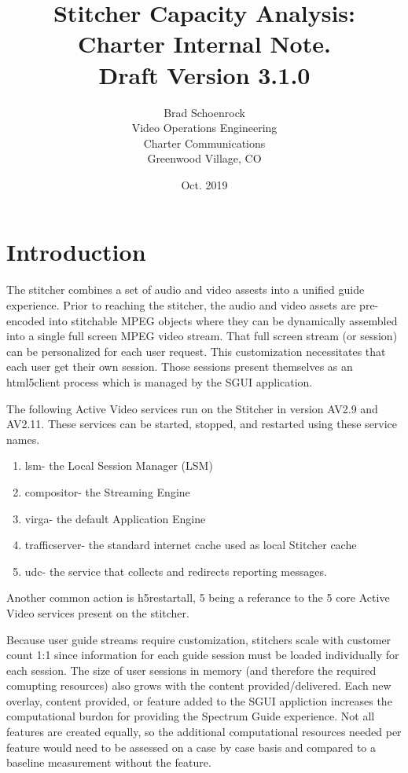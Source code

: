 \documentclass{article}
\author{Brad Schoenrock\\Video Operations Engineering\\Charter Communications\\Greenwood Village, CO}
\title{Stitcher Capacity Analysis:\\Charter Internal Note.\\Draft Version 3.1.0}
\date{Oct. 2019}
\begin{document}
\maketitle
\newpage

\tableofcontents
\newpage

\section{Introduction}
\label{SECTION-Introduction}

The stitcher combines a set of audio and video assests into a unified guide experience. Prior to reaching the stitcher, the audio and video assets are pre-encoded into stitchable MPEG objects where they can be dynamically assembled into a single full screen MPEG video stream. That full screen stream (or session) can be personalized for each user request. This customization necessitates that each user get their own session. Those sessions present themselves as an html5client process which is managed by the SGUI application. 

The following Active Video services run on the Stitcher in version AV2.9 and AV2.11. These services can be started, stopped, and restarted using these service names. 

\begin{enumerate}
\item lsm- the Local Session Manager (LSM)
\item compositor- the Streaming Engine
\item virga- the default Application Engine
\item trafficserver- the standard internet cache used as local Stitcher cache
\item udc- the service that collects and redirects reporting messages.
\end{enumerate}

Another common action is h5restartall, 5 being a referance to the 5 core Active Video services present on the stitcher.

Because user guide streams require customization, stitchers scale with customer count 1:1 since information for each guide session must be loaded individually for each session. The size of user sessions in memory (and therefore the required comupting resources) also grows with the content provided/delivered. Each new overlay, content provided, or feature added to the SGUI appliction increases the computational burdon for providing the Spectrum Guide experience. Not all features are created equally, so the additional computational resources needed per feature would need to be assessed on a case by case basis and compared to a baseline measurement without the feature. 
\end{document}
